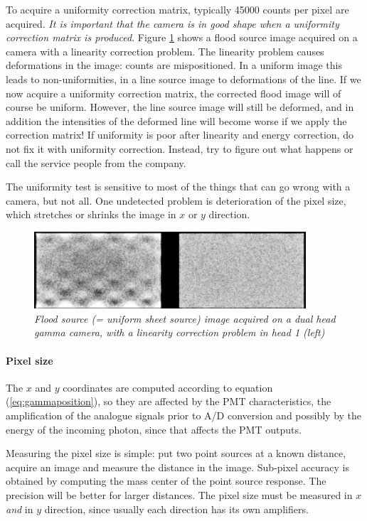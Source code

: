 \documentclass[11pt,oneside]{article}
\begin{document}
To acquire a uniformity correction matrix, typically 45000 counts per pixel
are acquired. {\em It is important that the camera is in good shape when a
uniformity correction matrix is produced}. Figure \ref{fig:qc_linproblem}
shows a flood source image acquired on a camera with a linearity correction
problem. The linearity problem causes deformations in the image: counts are
mispositioned. In a uniform image this leads to non-uniformities, in a line
source image to deformations of the line. If we now acquire a uniformity
correction matrix, the corrected flood image will of course be uniform.
However, the line source image will still be deformed, and in addition the
intensities of the deformed line will become worse if we apply the correction
matrix! If uniformity is poor after linearity and energy correction, do not
fix it with uniformity correction. Instead, try to figure out what happens or
call the service people from the company.

The uniformity test is sensitive to most of the things that can go wrong with
a camera, but not all. One undetected problem is deterioration of the pixel
size, which stretches or shrinks the image in $x$ or $y$ direction.

\begin{figure}[tb]
\centering
\includegraphics[width=0.9\textwidth]{figs/fig_qc_linproblem.pdf}
\caption{\label{fig:qc_linproblem} \emph{Flood source (= uniform sheet source)
image acquired on a dual head gamma camera, with a linearity correction
problem in head 1 (left)}}
\end{figure}

\paragraph{Pixel size}
The $x$ and $y$ coordinates are computed according to equation
(\ref{eq:gammaposition}), so they are affected by the PMT characteristics, the
amplification of the analogue signals prior to A/D conversion and possibly by
the energy of the incoming photon, since that affects the PMT outputs.

Measuring the pixel size is simple: put two point sources at a known distance,
acquire an image and measure the distance in the image. Sub-pixel accuracy is
obtained by computing the mass center of the point source response. The
precision will be better for larger distances. The pixel size must be measured
in $x$ {\em and} in $y$ direction, since usually each direction has its own
amplifiers.
\end{document}
